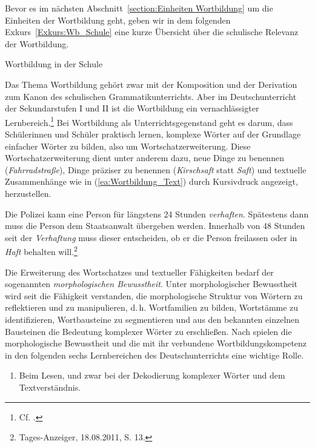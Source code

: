 Bevor es im nächsten Abschnitt~\ref{section:Einheiten Wortbildung} um die Einheiten der Wortbildung geht, geben wir in dem folgenden Exkurs~\ref{Exkurs:Wb_Schule} eine kurze Übersicht über die schulische Relevanz der Wortbildung. 

\newpage
\begin{Exkurs}{Wortbildung in der Schule}\label{Exkurs:Wb_Schule}

Das Thema Wortbildung gehört zwar mit der Komposition und der Derivation zum Kanon des schulischen Grammatikunterrichts. Aber im Deutschunterricht der Sekundarstufen I und II ist die Wortbildung ein vernachlässigter Lernbereich.\footnote{Cf. \citet[33]{Ulrich2021}.} Bei Wortbildung als Unterrichtsgegenstand geht es darum, dass Schülerinnen und Schüler praktisch lernen, komplexe Wörter auf der Grundlage einfacher Wörter zu bilden, also um Wortschatzerweiterung. Diese Wortschatzerweiterung dient unter anderem dazu, neue Dinge zu benennen (\textit{Fahrradstraße}), Dinge präziser zu benennen (\textit{Kirschsaft} statt \textit{Saft}) und textuelle Zusammenhänge wie in (\ref{ea:Wortbildung_Text}) durch Kursivdruck angezeigt, herzustellen.

\ea \label{ea:Wortbildung_Text} Die Polizei kann eine Person für längstens 24 Stunden \textit{verhaften}. Spätestens dann muss die Person dem Staatsanwalt übergeben werden. Innerhalb von 48 Stunden seit der \textit{Verhaftung} muss dieser entscheiden, ob er die Person freilassen oder in \textit{Haft} behalten will.\footnote{Tages-Anzeiger, 18.08.2011, S. 13.}
\z 

Die Erweiterung des Wortschatzes und textueller Fähigkeiten bedarf der sogenannten \textit{morphologischen Bewusstheit}. Unter morphologischer Bewusstheit wird seit \citet[194]{Carlisle1995} die Fähigkeit verstanden, die morphologische Struktur von Wörtern zu reflektieren und zu manipulieren, d.\,h. Wortfamilien zu bilden, Wortstämme zu identifizieren, Wortbausteine zu segmentieren und aus den bekannten einzelnen Bausteinen die Bedeutung komplexer Wörter zu erschließen. 
Nach \citet[92]{Seiffert2023} spielen die morphologische Bewusstheit und die mit ihr verbundene Wortbildungskompetenz in den folgenden sechs Lernbereichen des Deutschunterrichts eine wichtige Rolle.

\begin{enumerate}

\item Beim Lesen, und zwar bei der Dekodierung komplexer Wörter und dem Textverständnis.


\end{enumerate}
\end{Exkurs}
